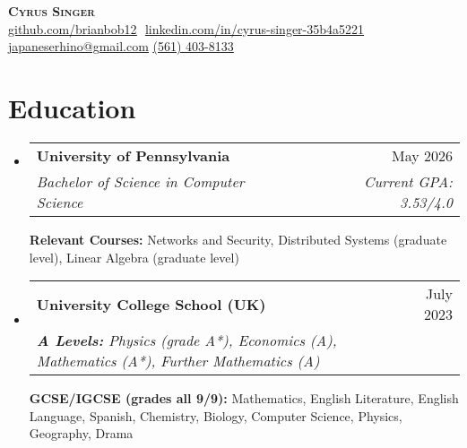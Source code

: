 \documentclass[letterpaper,11pt]{article}
\makeatletter
\newcommand{\resumeSubheading}[4]{
  \vspace{-2pt}\item
    \begin{tabular*}{0.97\textwidth}[t]{l@{\extracolsep{\fill}}r}
      \textbf{#1} & #2 \\
      \textit{\small#3} & \textit{\small #4} \\
    \end{tabular*}\vspace{-7pt}
}
\newcommand{\resumeSubHeadingListStart}{\begin{itemize}[leftmargin=0.15in, label={}]}
\newcommand{\resumeSubHeadingListEnd}{\end{itemize}}
\makeatother
\begin{document}
\hfill

\begin{center}
    \textbf{\Huge \scshape Cyrus Singer} \\ \vspace{8pt}
    \small 
    \href{https://github.com/brianbob12}{\underline{github.com/brianbob12}} $  $
    \href{https://www.linkedin.com/in/cyrus-singer-35b4a5221}{\underline{linkedin.com/in/cyrus-singer-35b4a5221}} $  $
    \href{mailto:japaneserhino@gmail.com}
    {\underline{japaneserhino@gmail.com}}
    \href{tel:561-403-8133}{\underline{(561) 403-8133}}
\end{center}

\section{Education}
  \resumeSubHeadingListStart
  
    \resumeSubheading
      {University of Pennsylvania}{May 2026}
      {Bachelor of Science in Computer Science}{Current GPA: 3.53/4.0}
      
      \vspace{5pt}

      \textbf{Relevant Courses:} \small{Networks and Security, Distributed Systems (graduate level), Linear Algebra (graduate level)}\\

    \resumeSubheading
      {University College School \footnotesize{(UK)}}{July 2023} 
      {\textbf{A Levels:} \footnotesize{Physics (grade A*), Economics (A), Mathematics (A*), Further Mathematics (A)}}{}
      \newline
      \newline
      {\textbf{GCSE/IGCSE (grades all 9/9):} \footnotesize{Mathematics, English Literature, English Language, Spanish, Chemistry, Biology, Computer Science, Physics, Geography, Drama }}{}



  \resumeSubHeadingListEnd

\end{document}
